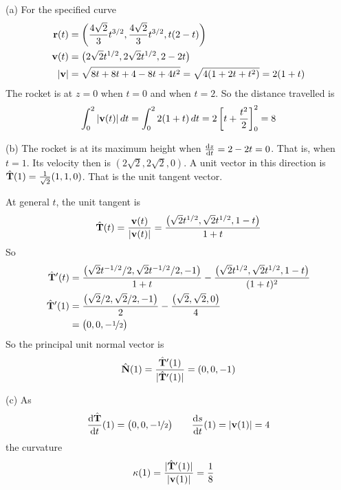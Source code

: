 \begin{solution} 
(a) 
For the specified curve
\begin{align*}
\mathbf{r}(t)&=\left(\frac{4\sqrt{2}}{3}t^{3/2},\frac{4\sqrt{2}}{3}t^{3/2},
            t(2-t)\right)\\
\mathbf{v}(t)&=\big(2\sqrt{2}t^{1/2},2\sqrt{2}t^{1/2},2-2t\big)\\
|\mathbf{v}|&=\sqrt{8t+8t+4-8t+4t^2}=\sqrt{4(1+2t+t^2)}= 2(1+t)
\end{align*}
The rocket is at $z=0$ when $t=0$ and when $t=2$.
So the distance travelled is 
\begin{align*}
\int_0^2|\mathbf{v}(t)|\,dt=\int_0^2 2(1+t)\,dt = 2\left[t+\frac{t^2}{2}\right]_0^2
=8
\end{align*}

(b) The rocket is at its maximum height when $\diff{z}{t}=2-2t=0$.
That is, when $t=1$. Its velocity then is $(2\sqrt{2},2\sqrt{2},0)$. A
unit vector in this direction is $\hat{\mathbf{T}}(1)=\frac{1}{\sqrt{2}}(1,1,0)$.
That is the unit tangent vector. 

At general $t$, the unit tangent is
\begin{equation*}
\hat{\mathbf{T}}(t) = \frac{\mathbf{v}(t)}{|\mathbf{v}(t)|}
           = \frac{\big(\sqrt{2}t^{1/2},\sqrt{2}t^{1/2},1-t\big)}{1+t} 
\end{equation*}
So
\begin{align*}
\hat{\mathbf{T}}'(t)  &= \frac{\big(\sqrt{2}t^{-1/2}/2,\sqrt{2}t^{-1/2}/2,-1\big)}{1+t}
              -\frac{\big(\sqrt{2}t^{1/2},\sqrt{2}t^{1/2},1-t\big)}{(1+t)^2} \\
\hat{\mathbf{T}}'(1)  &= \frac{\big(\sqrt{2}/2,\sqrt{2}/2,-1\big)}{2}
              -\frac{\big(\sqrt{2},\sqrt{2},0\big)}{4} \\
              &= \big(0,0, -\nicefrac{1}{2}\big)
\end{align*}
So the principal unit normal vector is
\begin{equation*}
\hat{\mathbf{N}}(1) = \frac{\hat{\mathbf{T}}'(1)}{|\hat{\mathbf{T}}'(1)|} = (0,0,-1)
\end{equation*}

(c) As
\begin{align*}
\diff{\hat\vT}{t}(1)  = \big(0,0, -\nicefrac{1}{2}\big)\qquad
\diff{s}{t}(1) = |\vv(1)| = 4
\end{align*}
the curvature
\begin{align*}
\kappa(1) &= \frac{|\hat{\mathbf{T}}'(1)|}{|\mathbf{v}(1)|}
=\frac{1}{8}
\end{align*}

\end{solution}

